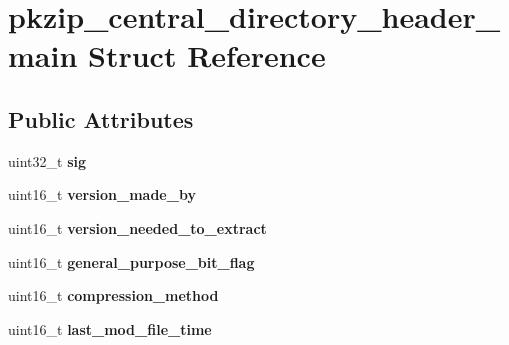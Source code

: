 \hypertarget{structpkzip__central__directory__header__main}{\section{pkzip\-\_\-central\-\_\-directory\-\_\-header\-\_\-main Struct Reference}
\label{structpkzip__central__directory__header__main}
}
\subsection*{Public Attributes}
\begin{DoxyCompactItemize}
\item 
\hypertarget{structpkzip__central__directory__header__main_a1a2fc1174af2d49a26dba61546b457f7}{uint32\-\_\-t {\bfseries sig}}\label{structpkzip__central__directory__header__main_a1a2fc1174af2d49a26dba61546b457f7}

\item 
\hypertarget{structpkzip__central__directory__header__main_af15874451c42897386d6814d91dc8863}{uint16\-\_\-t {\bfseries version\-\_\-made\-\_\-by}}\label{structpkzip__central__directory__header__main_af15874451c42897386d6814d91dc8863}

\item 
\hypertarget{structpkzip__central__directory__header__main_a6993270b96b1bfbb3f9afa3d8b125088}{uint16\-\_\-t {\bfseries version\-\_\-needed\-\_\-to\-\_\-extract}}\label{structpkzip__central__directory__header__main_a6993270b96b1bfbb3f9afa3d8b125088}

\item 
\hypertarget{structpkzip__central__directory__header__main_ad5f19376e33ca8d1f58487be8a6642da}{uint16\-\_\-t {\bfseries general\-\_\-purpose\-\_\-bit\-\_\-flag}}\label{structpkzip__central__directory__header__main_ad5f19376e33ca8d1f58487be8a6642da}

\item 
\hypertarget{structpkzip__central__directory__header__main_a6c1afd97561baacecea1d3e18ecf7a94}{uint16\-\_\-t {\bfseries compression\-\_\-method}}\label{structpkzip__central__directory__header__main_a6c1afd97561baacecea1d3e18ecf7a94}

\item 
\hypertarget{structpkzip__central__directory__header__main_a8ee67f87558633fe6dfc43c6ec5862e9}{uint16\-\_\-t {\bfseries last\-\_\-mod\-\_\-file\-\_\-time}}\label{structpkzip__central__directory__header__main_a8ee67f87558633fe6dfc43c6ec5862e9}


\end{DoxyCompactItemize}
